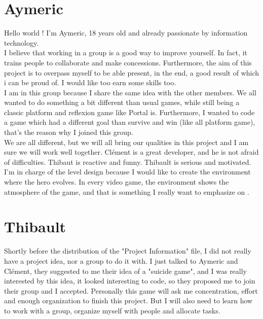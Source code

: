 	\section{Aymeric}

		Hello world ! I'm Aymeric, 18 years old and already passionate by information technology.
		\\
		I believe that working in a group is a good way to improve yourself. In fact,
		it trains people to collaborate and make concessions. Furthermore, the aim of this project is
		to overpass myself to be able present, in the end, a good result of which i can be proud of.
		I would like too earn some skills too.
		\\
		I am in this group because I share the same idea with the other members.
		We all wanted to do something a bit different than usual games, while still being a classic platform
		and reflexion game like Portal is. Furthermore, I wanted to code a game which had a different goal
		than survive and win (like all platform game), that's the reason why I joined this group.
		\\
		We are all different, but we will all bring our qualities in this project and I am sure we will work well together.
		Clément is a great developer, and he is not afraid of difficulties. Thibaut is reactive and funny.
		Thibault is serious and motivated.
		\\
		I'm in charge of the level design because I would like to create the environment where the hero evolves.
		In every video game, the environment shows the atmosphere of the game,
		and that is something I really want to emphasize on .

	\section{Thibault}

		Shortly before the distribution of the "Project Information" file, I did not really have a project idea,
		nor a group to do it with. I just talked to Aymeric and Clément,
		they suggested to me their idea of a "suicide game", and I was really interested by this idea,
		it looked interesting to code, so they proposed me to join their group and I accepted.
		Personally this game will ask me concentration, effort and enough organization to finish this project.
		But I will also need to learn how to work with a group, organize myself with people and allocate tasks.
